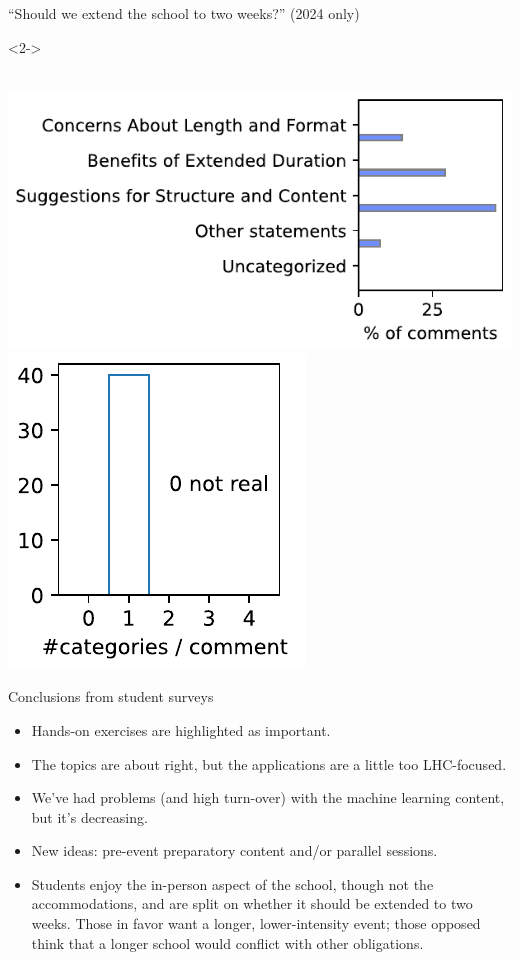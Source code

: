 \documentclass[aspectratio=169]{beamer}
\begin{document}
\begin{frame}{``Should we extend the school to two weeks?'' (2024 only)}
\begin{uncoverenv}<2->
\vspace{-5 cm}
\begin{tcolorbox}[colback=white, colframe=black]
\begin{minipage}{\linewidth}
\mbox{ } \hfill \includegraphics[height=4 cm]{PLOTS/two_weeks_categorization.pdf}\includegraphics[height=3 cm]{PLOTS/two_weeks_categorization_hist.pdf} \hfill \mbox{ }
\end{minipage}
\end{tcolorbox}
\end{uncoverenv}
\end{frame}

\begin{frame}{Conclusions from student surveys}
\vspace{0.5 cm}
\large
\begin{itemize}\setlength{\itemsep}{0.5 cm}
\item<1-> Hands-on exercises are highlighted as important.
\item<2-> The topics are about right, but the applications are a little too LHC-focused.
\item<3-> We've had problems (and high turn-over) with the machine learning content, but it's decreasing.
\item<4-> New ideas: pre-event preparatory content and/or parallel sessions.
\item<5-> Students enjoy the in-person aspect of the school, though not the accommodations, and are split on whether it should be extended to two weeks. Those in favor want a longer, lower-intensity event; those opposed think that a longer school would conflict with other obligations.
\end{itemize}
\end{frame}
\end{document}
